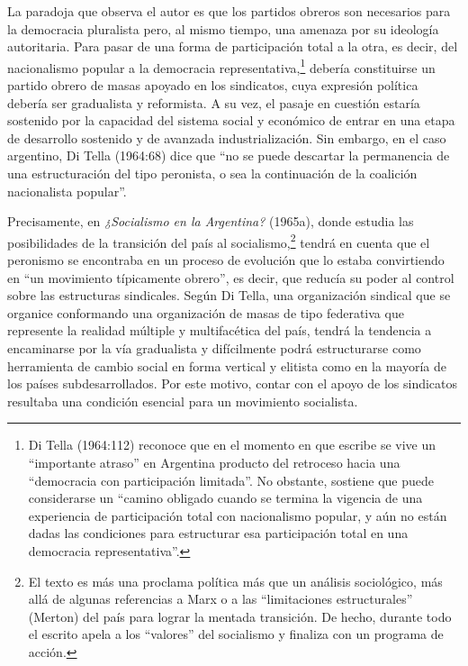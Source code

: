 La paradoja que observa el autor es que los partidos obreros son necesarios para la democracia pluralista pero, al mismo tiempo, una amenaza por su ideología autoritaria. Para pasar de una forma de participación total a la otra, es decir, del nacionalismo popular a la democracia representativa,\footnote{Di Tella (1964:112) reconoce que en el momento en que escribe se vive un ``importante atraso'' en Argentina producto del retroceso hacia una ``democracia con participación limitada''. No obstante, sostiene que puede considerarse un ``camino obligado cuando se termina la vigencia de una experiencia de participación total con nacionalismo popular, y aún no están dadas las condiciones para estructurar esa participación total en una democracia representativa''.} debería constituirse un partido obrero de masas apoyado en los sindicatos, cuya expresión política debería ser gradualista y reformista. A su vez, el pasaje en cuestión estaría sostenido por la capacidad del sistema social y económico de entrar en una etapa de desarrollo sostenido y de avanzada industrialización. Sin embargo, en el caso argentino, Di Tella (1964:68) dice que ``no se puede descartar la permanencia de una estructuración del tipo peronista, o sea la continuación de la coalición nacionalista popular''.

Precisamente, en \emph{¿Socialismo en la Argentina?} (1965a), donde estudia las posibilidades de la transición del país al socialismo,\footnote{El texto es más una proclama política más que un análisis sociológico, más allá de algunas referencias a Marx o a las ``limitaciones estructurales'' (Merton) del país para lograr la mentada transición. De hecho, durante todo el escrito apela a los ``valores'' del socialismo y finaliza con un programa de acción.} tendrá en cuenta que el peronismo se encontraba en un proceso de evolución que lo estaba convirtiendo en ``un movimiento típicamente obrero'', es decir, que reducía su poder al control sobre las estructuras sindicales. Según Di Tella, una organización sindical que se organice conformando una organización de masas de tipo federativa que represente la realidad múltiple y multifacética del país, tendrá la tendencia a encaminarse por la vía gradualista y difícilmente podrá estructurarse como herramienta de cambio social en forma vertical y elitista como en la mayoría de los países subdesarrollados. Por este motivo, contar con el apoyo de los sindicatos resultaba una condición esencial para un movimiento socialista.

